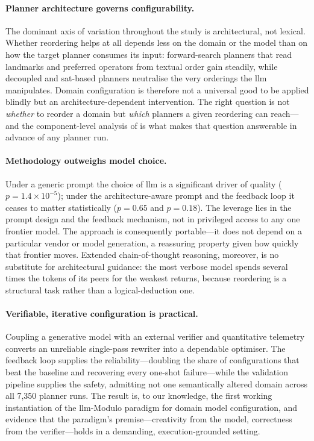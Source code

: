 \paragraph{Planner architecture governs configurability.}
The dominant axis of variation throughout the study is architectural, not lexical.
Whether reordering helps at all depends less on the domain or the model than on how the target planner consumes its input: forward-search planners that read landmarks and preferred operators from textual order gain steadily, while decoupled and \gls{sat}-based planners neutralise the very orderings the \gls{llm} manipulates.
Domain configuration is therefore not a universal good to be applied blindly but an architecture-dependent intervention.
The right question is not \emph{whether} to reorder a domain but \emph{which} planners a given reordering can reach---and the component-level analysis of  is what makes that question answerable in advance of any planner run.

\paragraph{Methodology outweighs model choice.}
Under a generic prompt the choice of \gls{llm} is a significant driver of quality ($p = 1.4 \times 10^{-5}$); under the architecture-aware prompt and the feedback loop it ceases to matter statistically ($p = 0.65$ and $p = 0.18$).
The leverage lies in the prompt design and the feedback mechanism, not in privileged access to any one frontier model.
The approach is consequently portable---it does not depend on a particular vendor or model generation, a reassuring property given how quickly that frontier moves.
Extended chain-of-thought reasoning, moreover, is no substitute for architectural guidance: the most verbose model spends several times the tokens of its peers for the weakest returns, because reordering is a structural task rather than a logical-deduction one.

\paragraph{Verifiable, iterative configuration is practical.}
Coupling a generative model with an external verifier and quantitative telemetry converts an unreliable single-pass rewriter into a dependable optimiser.
The feedback loop supplies the reliability---doubling the share of configurations that beat the baseline and recovering every one-shot failure---while the validation pipeline supplies the safety, admitting not one semantically altered domain across all 7{,}350 planner runs.
The result is, to our knowledge, the first working instantiation of the \gls{llm}-Modulo paradigm for domain model configuration, and evidence that the paradigm's premise---creativity from the model, correctness from the verifier---holds in a demanding, execution-grounded setting.

